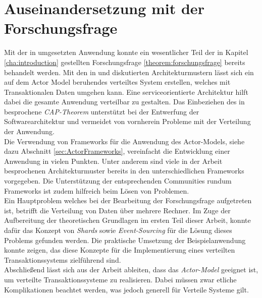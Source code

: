 \section{Auseinandersetzung mit der Forschungsfrage}
Mit der in  umgesetzten Anwendung konnte ein wesentlicher Teil der in Kapitel \ref{cha:introduction} gestellten Forschungsfrage \ref{theorem:forschungsfrage} bereits behandelt werden. Mit den in \cite{Vernon2015ReactiveAkka} und \cite{akkaInAction} diskutierten Architekturmustern lässt sich ein auf dem Actor Model beruhendes verteiltes System erstellen, welches mit Transaktionalen Daten umgehen kann. Eine serviceorientierte Architektur hilft dabei die gesamte Anwendung verteilbar zu gestalten. 
Das  Einbeziehen des in \cite{gilbertPerspectiveCAPTheorem2012} besprochene \textit{CAP-Theorem} unterstützt bei der Entwerfung der Softwarearchitektur und vermeidet von vornherein Probleme mit der Verteilung der Anwendung. \\ 
Die Verwendung von Frameworks für die Anwendung des Actor-Models, siehe dazu Abschnitt \ref{sec:ActorFrameworks}, vereinfacht die Entwicklung einer Anwendung in vielen Punkten. Unter anderem sind viele in der Arbeit besprochenen Architekturmuster bereits in den unterschiedlichen Frameworks vorgegeben. Die Unterstützung der entsprechenden Communities rundum Frameworks ist zudem hilfreich beim Lösen von Problemen. \\
Ein Hauptproblem welches bei der Bearbeitung der Forschungsfrage aufgetreten ist, betrifft die Verteilung von Daten über mehrere Rechner. Im Zuge der Aufbereitung der theoretischen Grundlagen im ersten Teil dieser Arbeit, konnte dafür das Konzept von \textit{Shards} sowie \textit{Event-Sourcing} für die Lösung dieses Problems gefunden werden. Die praktische Umsetzung der Beispielanwendung konnte zeigen, das diese Konzepte für die Implementierung eines verteilten Transaktionssystems zielführend sind. \\
Abschließend lässt sich aus der Arbeit ableiten, dass das \textit{Actor-Model} geeignet ist, um verteilte Transaktionssysteme zu realisieren. Dabei müssen zwar etliche Komplikationen beachtet werden, was jedoch generell für Verteile Systeme gilt.


